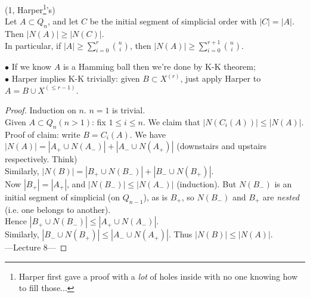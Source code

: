 \documentclass[a4paper]{article}
\begin{document}
\begin{thm} (1, Harper\footnote{Harper first gave a proof with a \emph{lot} of holes inside with no one knowing how to fill those...}'s)\\
    Let $A \subset Q_n$, and let $C$ be the initial segment of simplicial order with $|C| = |A|$. Then $|N(A)| \geq |N(C)|$.\\
    In particular, if $|A| \geq \sum_{i=0}^r {n \choose i}$, then $|N(A)| \geq \sum_{i=0}^{r+1} {n \choose i}$.

    \begin{rem}
        $\bullet$ If we know $A$ is a Hamming ball then we're done by K-K theorem;\\
        $\bullet$ Harper implies K-K trivially: given $B \subset X^{(r)}$, just apply Harper to $A=B \cup X^{(\leq r-1)}$.
    \end{rem}
    
    \begin{proof}
        Induction on $n$. $n=1$ is trivial.\\
        Given $A \subset Q_n(n>1)$: fix $1 \leq i \leq n$. We claim that $|N(C_i(A))| \leq |N(A)|$.\\
        Proof of claim: write $B = C_i(A)$. We have $|N(A)| = |A_+ \cup N(A_-)| + |A_- \cup N(A_+)|$ (downstairs and upstairs respectively. Think)\\
        Similarly, $|N(B)| = |B_+ \cup N(B_-)| + |B_- \cup N(B_+)|$.\\
        Now $|B_+| = |A_+|$, and $|N(B_-)| \leq |N(A_-)|$ (induction). But $N(B_-)$ is an initial segment of simplicial (on $Q_{n-1}$), as is $B_+$, so $N(B_-)$ and $B_+$ are \emph{nested} (i.e. one belongs to another).\\
        Hence $|B_+ \cup N(B_-)| \leq |A_+ \cup N(A_-)|$.\\
        Similarly, $|B_- \cup N(B_+)| \leq |A_- \cup N(A_+)|$. Thus $|N(B)| \leq |N(A)|$.\\

        ---Lecture 8---


\end{proof}
\end{thm}
\end{document}
